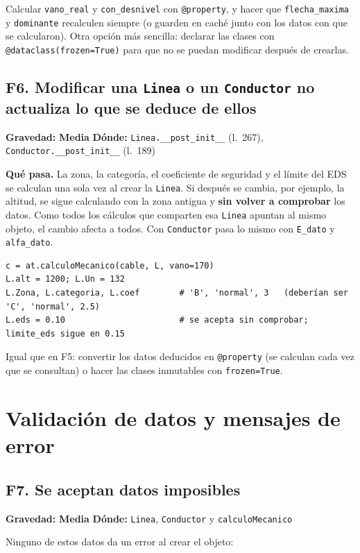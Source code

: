 \documentclass[11pt,a4paper]{article}
\newcommand{\media}{\textcolor{media}{\textbf{Media}}}
\newcommand{\code}[1]{\texttt{#1}}
\newcommand{\fallo}[4]{%
  \subsection[#1. #2]{#1. #2}
  \noindent\textbf{Gravedad:} #3 \quad \textbf{Dónde:} #4\par\medskip}
\begin{document}
\begin{arreglo}
Calcular \code{vano\_real} y \code{con\_desnivel} con \code{@property}, y hacer que \code{flecha\_maxima} y \code{dominante} recalculen siempre (o guarden en caché junto con los datos con que se calcularon). Otra opción más sencilla: declarar las clases con \code{@dataclass(frozen=True)} para que no se puedan modificar después de crearlas.
\end{arreglo}

\fallo{F6}{Modificar una \code{Linea} o un \code{Conductor} no actualiza lo que se deduce de ellos}{\media}{\code{Linea.\_\_post\_init\_\_} (l.~267), \code{Conductor.\_\_post\_init\_\_} (l.~189)}

\textbf{Qué pasa.} La zona, la categoría, el coeficiente de seguridad y el límite del EDS se calculan una sola vez al crear la \code{Linea}. Si después se cambia, por ejemplo, la altitud, se sigue calculando con la zona antigua y \textbf{sin volver a comprobar} los datos. Como todos los cálculos que comparten esa \code{Linea} apuntan al mismo objeto, el cambio afecta a todos. Con \code{Conductor} pasa lo mismo con \code{E\_dato} y \code{alfa\_dato}.
\begin{lstlisting}
c = at.calculoMecanico(cable, L, vano=170)
L.alt = 1200; L.Un = 132
L.Zona, L.categoria, L.coef        # 'B', 'normal', 3   (deberían ser 'C', 'normal', 2.5)
L.eds = 0.10                       # se acepta sin comprobar; limite_eds sigue en 0.15
\end{lstlisting}

\begin{arreglo}
Igual que en F5: convertir los datos deducidos en \code{@property} (se calculan cada vez que se consultan) o hacer las clases inmutables con \code{frozen=True}.
\end{arreglo}

\section{Validación de datos y mensajes de error}

\fallo{F7}{Se aceptan datos imposibles}{\media}{\code{Linea}, \code{Conductor} y \code{calculoMecanico}}

Ninguno de estos datos da un error al crear el objeto:
\end{document}
